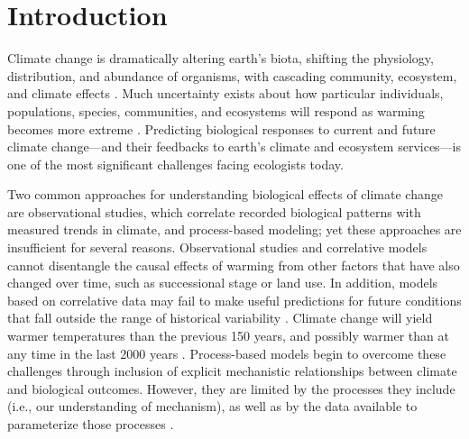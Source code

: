 \documentclass{article}
\begin{document}
 
\section* {Introduction}
\par Climate change is dramatically altering earth's biota, shifting the physiology, distribution, and abundance of organisms, with cascading community, ecosystem, and climate effects \citep{shukla1982,cox2000,thomas2004,parmesan2006,field2007,sheldon2011,urban2012}. Much uncertainty exists about how particular individuals, populations, species, communities, and ecosystems will respond as warming becomes more extreme \citep{thuiller2004,friedlingstein2014}.
Predicting biological responses to current and future climate change---and their feedbacks to earth's climate and ecosystem services---is one of the most significant challenges facing ecologists today.
\par Two common approaches for understanding biological effects of climate change are observational studies, which correlate recorded biological patterns with measured trends in climate, and process-based modeling; yet these approaches are insufficient for several reasons. %
Observational studies and correlative models cannot disentangle the causal effects of warming from other factors that have also changed over time, such as successional stage or land use. In addition, models based on correlative data may fail to make useful predictions for future conditions that fall outside the range of historical variability \citep [e.g.,][]{pearson2004,hampe2004,ibanez2006,swab2012,chuine2016}. Climate change will yield warmer temperatures than the previous 150 years, and possibly warmer than at any time in the last 2000 years \citep{ohlemuller2006,williams2007,williams2007b,ipcc2013}. Process-based models begin to overcome these challenges through inclusion of explicit mechanistic relationships between climate and biological outcomes. However, they are limited by the processes they include (i.e., our understanding of mechanism), as well as by the data available to parameterize those processes \citep{moorcroft2006,kearney2009}. 
\end{document}
